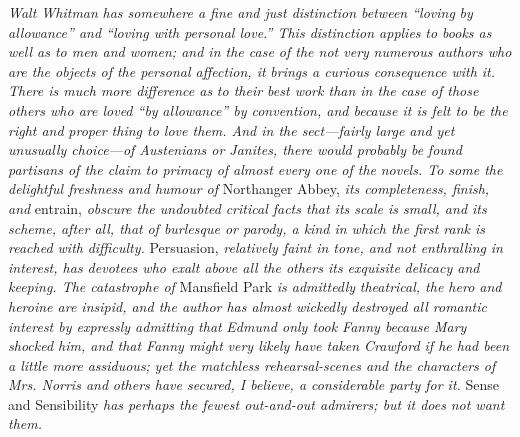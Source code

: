 \documentclass[12pt,openright]{book}
\begin{document}
\noindent \textit{Walt Whitman}\textit{ }\textit{has somewhere a fine and just distinction between “loving}\textit{ }\textit{by allowance” and “loving with personal love.” This distinction applies}\textit{ }\textit{to books as well as to men and women; and in the case of the not very}\textit{ }\textit{numerous authors who are the objects of the personal affection, it}\textit{ }\textit{brings a curious consequence with it. There is much more difference as}\textit{ }\textit{to their best work than in the case of those others who are loved “by}\textit{ }\textit{allowance” by convention, and because it is felt to be the right and}\textit{ }\textit{proper thing to love them. And in the sect—fairly large and yet}\textit{ }\textit{unusually choice—of Austenians or Janites, there would probably be}\textit{ }\textit{found partisans of the claim to primacy of almost every one of the}\textit{ }\textit{novels. To some the delightful freshness and humour of} Northanger Abbey, \textit{its completeness, finish, and} entrain, \textit{obscure the undoubted}\textit{ }\textit{critical facts that its scale is small, and its scheme, after all, that}\textit{ }\textit{of burlesque or parody, a kind in which the first rank is reached with}\textit{ }\textit{difficulty.} Persuasion, \textit{relatively faint in tone, and not enthralling}\textit{ }\textit{in interest, has devotees who exalt above all the others its exquisite}\textit{ }\textit{delicacy and keeping. The catastrophe of} Mansfield Park \textit{is admittedly}\textit{ }\textit{theatrical, the hero and heroine are insipid, and the author has almost}\textit{ }\textit{wickedly destroyed all romantic interest by expressly admitting that}\textit{ }\textit{Edmund only took Fanny because Mary shocked him, and that Fanny might}\textit{ }\textit{very likely have taken Crawford if he had been a little more assiduous;}\textit{ }\textit{yet the matchless rehearsal-scenes and the characters of Mrs. Norris and}\textit{ }\textit{others have secured, I believe, a considerable party for it.} Sense and Sensibility \textit{has perhaps the fewest out-and-out admirers; but it does}\textit{ }\textit{not want them.}
\end{document}
